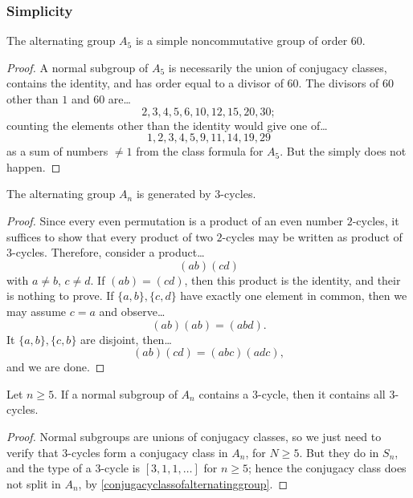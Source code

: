 \subsubsection{Simplicity}\label{simplictyalternatinggroup}

\begin{corollary}
The alternating group $A_5$ is a simple noncommutative group of order $60$.
\end{corollary}

\begin{proof}
A normal subgroup of $A_5$ is necessarily the union of conjugacy classes, contains the identity, and has order equal to a divisor of $60$. The divisors of $60$ other than $1$ and $60$ are\dots
$$2,3,4,5,6,10,12,15,20,30;$$
counting the elements other than the identity would give one of\dots
$$1,2,3,4,5,9,11,14,19,29$$
as a sum of numbers $\neq 1$ from the class formula for $A_5$. But the simply does not happen.

\end{proof}

\begin{lemma}
\label{alternatinggroupthreecycles1}
The alternating group $A_n$ is generated by $3$-cycles.
\end{lemma}

\begin{proof}
Since every even permutation is a product of an even number $2$-cycles, it suffices to show that every product of two $2$-cycles may be written as product of $3$-cycles. Therefore, consider a product\dots
$$(ab)(cd)$$
with $a \neq b$, $c \neq d$. If $(ab) = (cd)$, then this product is the identity, and their is nothing to prove. If $\{ a,b \}, \{ c,d \}$ have exactly one element in common, then we may assume $c = a$ and observe\dots
$$(ab)(ab) = (abd).$$
It $\{ a,b \}, \{ c,b \}$ are disjoint, then\dots
$$(ab)(cd) = (abc)(adc),$$
and we are done.
\end{proof}

\begin{proposition}
\label{alternatinggroupthreecycles2}
Let $n \geq 5$. If a normal subgroup of $A_n$ contains a $3$-cycle, then it contains all $3$-cycles.
\end{proposition}

\begin{proof}
Normal subgroups are unions of conjugacy classes, so we just need to verify that $3$-cycles form a conjugacy class in $A_n$, for $N \geq 5$. But they do in $S_n$, and the type of a
$3$-cycle is $[3,1,1,\dots]$ for $n \geq 5$; hence the conjugacy class does not split in $A_n$, by \ref{conjugacyclassofalternatinggroup}.
\end{proof}

